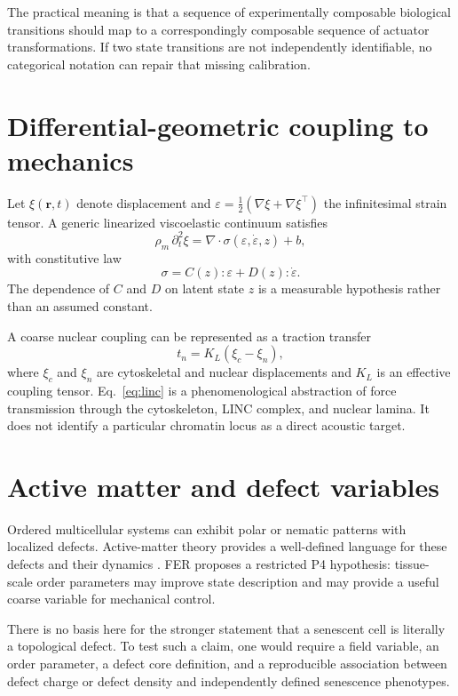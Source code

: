 \documentclass[11pt]{article}
\begin{document}
The practical meaning is that a sequence of experimentally composable biological transitions should map to a correspondingly composable sequence of actuator transformations. If two state transitions are not independently identifiable, no categorical notation can repair that missing calibration.

\section{Differential-geometric coupling to mechanics}
Let $\xi(\mathbf r,t)$ denote displacement and $\varepsilon=\frac12(\nabla\xi+\nabla\xi^\top)$ the infinitesimal strain tensor. A generic linearized viscoelastic continuum satisfies
\begin{equation}
 \rho_m\,\partial_t^2\xi=\nabla\cdot\sigma(\varepsilon,\dot\varepsilon,z)+b,
\label{eq:continuum}
\end{equation}
with constitutive law
\begin{equation}
 \sigma=C(z):\varepsilon+D(z):\dot\varepsilon.
\label{eq:constitutive}
\end{equation}
The dependence of $C$ and $D$ on latent state $z$ is a measurable hypothesis rather than an assumed constant.

A coarse nuclear coupling can be represented as a traction transfer
\begin{equation}
 t_n=K_L(\xi_c-\xi_n),
\label{eq:linc}
\end{equation}
where $\xi_c$ and $\xi_n$ are cytoskeletal and nuclear displacements and $K_L$ is an effective coupling tensor. Eq.~\eqref{eq:linc} is a phenomenological abstraction of force transmission through the cytoskeleton, LINC complex, and nuclear lamina. It does not identify a particular chromatin locus as a direct acoustic target.

\section{Active matter and defect variables}
Ordered multicellular systems can exhibit polar or nematic patterns with localized defects. Active-matter theory provides a well-defined language for these defects and their dynamics \cite{marchetti2013,angheluta2026,beer2026}. FER proposes a restricted P4 hypothesis: tissue-scale order parameters may improve state description and may provide a useful coarse variable for mechanical control.

There is no basis here for the stronger statement that a senescent cell is literally a topological defect. To test such a claim, one would require a field variable, an order parameter, a defect core definition, and a reproducible association between defect charge or defect density and independently defined senescence phenotypes.
\end{document}
